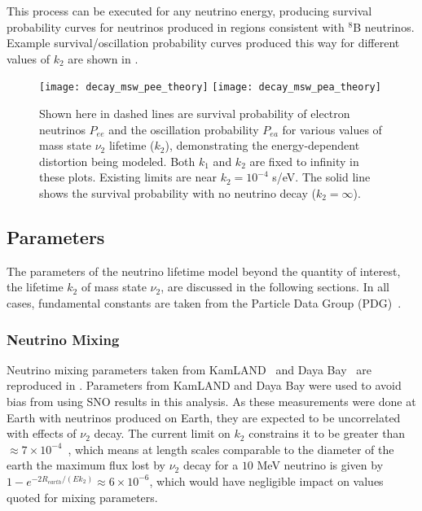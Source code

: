 This process can be executed for any neutrino energy, producing survival probability curves for neutrinos produced in regions consistent with $^8$B neutrinos.
Example survival/oscillation probability curves produced this way for different values of $k_2$ are shown in .

\begin{figure}
\centering
\texttt{[image: decay\_msw\_pee\_theory]}
\texttt{[image: decay\_msw\_pea\_theory]}
\caption{
Shown here in dashed lines are survival probability of
electron neutrinos $P_{ee}$ and the oscillation probability $P_{ea}$ for
various values of mass state $\nu_2$ lifetime ($k_2$), demonstrating the
energy-dependent distortion being modeled. Both $k_1$ and $k_2$ are fixed
to infinity in these plots. Existing limits are near $k_2 = 10^{-4}$ s/eV.
The solid line shows the survival probability with no neutrino
decay ($k_2 = \infty$).
}
\label{fig:model}
\end{figure}

\subsection{Parameters}
\label{parameters}

The parameters of the neutrino lifetime model beyond the quantity of interest, the lifetime $k_2$ of mass state $\nu_2$, are discussed in the following sections.
In all cases, fundamental constants are taken from the Particle Data Group (PDG)~\cite{pdg}.

\subsubsection{Neutrino Mixing}
Neutrino mixing parameters taken from KamLAND~\cite{kamland} and Daya Bay~\cite{dayabay} are reproduced in . 
Parameters from KamLAND and Daya Bay were used to avoid bias from using SNO results in this analysis.
As these measurements were done at Earth with neutrinos produced on Earth, they are expected to be uncorrelated with effects of $\nu_2$ decay.
The current limit on $k_2$ constrains it to be greater than $\approx7\times10^{-4}$~\cite{picoreti}, which means at length scales comparable to the diameter of the earth the maximum flux lost by $\nu_2$ decay for a $10$ MeV neutrino is given by
$1-e^{-2R_{earth}/(E k_2)} \approx 6\times10^{-6}$,
which would have negligible impact on values quoted for mixing parameters.

